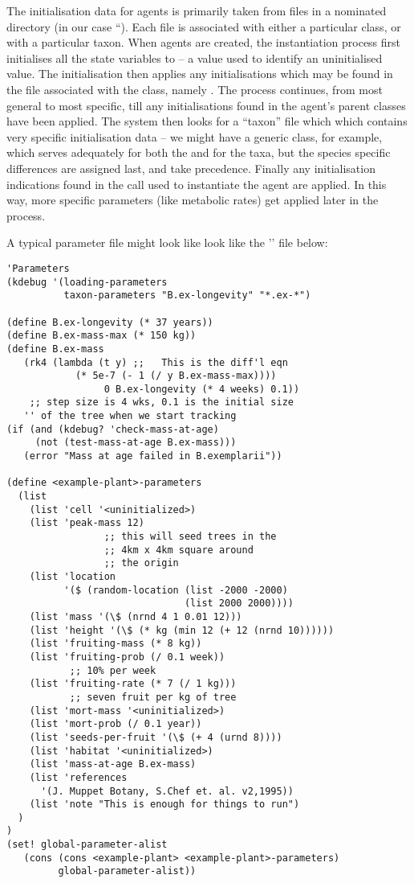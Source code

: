 The initialisation data for agents is primarily taken from files in a
nominated directory (in our case ``).  Each file
is associated with either a particular class, or with a particular
taxon.  When agents are created, the instantiation process first
initialises all the state variables to  -- a value
used to identify an uninitialised value.  The initialisation then
applies any initialisations which may be found in the file associated
with the  class, namely .
The process continues, from most general to most specific, till any 
initialisations found in the agent's parent classes have been
applied.  The system then looks for a ``taxon'' file which which
contains very specific initialisation data -- we might have a generic
 class, for example, which serves adequately for both the
 and for the  taxa, but the species
specific differences are assigned last, and take precedence.  Finally any
initialisation indications found in the  call
used to instantiate the agent are applied.  In this way, more specific
parameters (like metabolic rates) get applied later in the process.

A typical parameter file might look
like look like the '' file below:
\label{parameters}\label{kdebug}
\begin{verbatim}
'Parameters
(kdebug '(loading-parameters 
          taxon-parameters "B.ex-longevity" "*.ex-*") 

(define B.ex-longevity (* 37 years))
(define B.ex-mass-max (* 150 kg))
(define B.ex-mass  
   (rk4 (lambda (t y) ;;   This is the diff'l eqn
			(* 5e-7 (- 1 (/ y B.ex-mass-max))))
				 0 B.ex-longevity (* 4 weeks) 0.1))
	;; step size is 4 wks, 0.1 is the initial size 
   '' of the tree when we start tracking
(if (and (kdebug? 'check-mass-at-age)
     (not (test-mass-at-age B.ex-mass)))
   (error "Mass at age failed in B.exemplarii"))

(define <example-plant>-parameters
  (list
    (list 'cell '<uninitialized>)
    (list 'peak-mass 12)
                 ;; this will seed trees in the
                 ;; 4km x 4km square around
                 ;; the origin
    (list 'location 
          '($ (random-location (list -2000 -2000) 
                               (list 2000 2000))))
    (list 'mass '(\$ (nrnd 4 1 0.01 12)))
    (list 'height '(\$ (* kg (min 12 (+ 12 (nrnd 10))))))
    (list 'fruiting-mass (* 8 kg))
    (list 'fruiting-prob (/ 0.1 week))
           ;; 10% per week
    (list 'fruiting-rate (* 7 (/ 1 kg)))
           ;; seven fruit per kg of tree
    (list 'mort-mass '<uninitialized>)
    (list 'mort-prob (/ 0.1 year))
    (list 'seeds-per-fruit '(\$ (+ 4 (urnd 8))))
    (list 'habitat '<uninitialized>)
    (list 'mass-at-age B.ex-mass)
    (list 'references 
      '(J. Muppet Botany, S.Chef et. al. v2,1995))
    (list 'note "This is enough for things to run")
  )
)
(set! global-parameter-alist 
   (cons (cons <example-plant> <example-plant>-parameters) 
         global-parameter-alist))
\end{verbatim}


